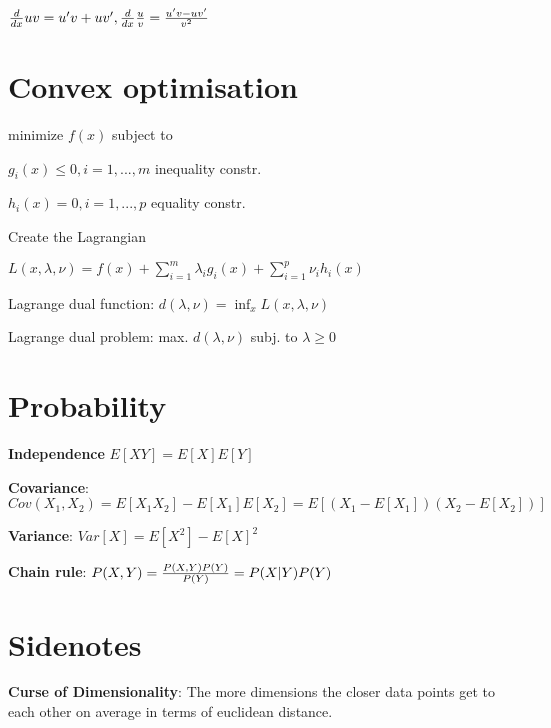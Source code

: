 \documentclass[a4paper,11pt,twocolumn]{article}
\begin{document}
${d \over {dx}} uv = u'v + uv', {d \over {dx}} {u \over v} = {u'v - uv' \over v^2 }$




\section{Convex optimisation}

minimize $f(x)$ subject to 

$g_i(x) \leq 0, i = 1,...,m$ inequality constr.

$h_i(x) = 0, i = 1,...,p$ equality constr.

Create the Lagrangian

$L(x, \lambda, \nu) = f(x) + \sum_{i=1}^m{\lambda_i g_i(x) + \sum_{i=1}^p{\nu_i h_i(x)}}$

Lagrange dual function: $ d(\lambda, \nu) = \inf_{x} L (x,\lambda, \nu) $

Lagrange dual problem: max. $d(\lambda, \nu)$  subj. to $\lambda \geq 0$

\section{Probability}

\textbf{Independence} $E[XY] = E[X] E[Y]$

\textbf{Covariance}: $Cov(X_1, X_2) = E[X_1 X_2] - E[X_1] E[X_2] = E[(X_1 - E[X_1])(X_2-E[X_2])]$

\textbf{Variance}: $Var[X] = E[X^2] - E[X]^2$


\textbf{Chain rule}: $P(X,Y) = {{P(X,Y)P(Y)}\over{P(Y)}} = P(X|Y)P(Y)$

\section{Sidenotes}

\textbf{Curse of Dimensionality}: The more dimensions the closer data points get to each other on average in terms of euclidean distance.
\end{document}
